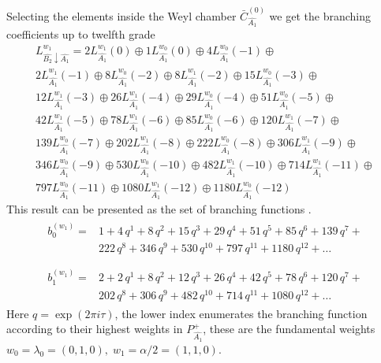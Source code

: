 \documentclass[a4paper,12pt]{article}
\theoremstyle{definition} \newtheorem{Def}{Definition}
\begin{document}
Selecting the elements inside the  Weyl chamber
$\bar{C}^{\left( 0 \right)}_{\hat{A_1}}$
we get the branching coefficients up to twelfth grade
\begin{multline}
  \label{eq:28}
  L^{w_1}_{\hat{B_2}\downarrow \hat{A_1}}=2 L_{\hat{A_1}}^{w_1}(0)\oplus 1 L_{\hat{A_1}}^{w_0}(0)\oplus 4 L_{\hat{A_1}}^{w_0}(-1)\oplus\\
    2 L_{\hat{A_1}}^{w_1}(-1)\oplus 8 L_{\hat{A_1}}^{w_0}(-2)\oplus
    8 L_{\hat{A_1}}^{w_1}(-2)\oplus 15 L_{\hat{A_1}}^{w_0}(-3)\oplus\\
    12 L_{\hat{A_1}}^{w_1}(-3)\oplus 26 L_{\hat{A_1}}^{w_1}(-4)\oplus
    29 L_{\hat{A_1}}^{w_0}(-4)\oplus 51 L_{\hat{A_1}}^{w_0}(-5)\oplus\\
    42 L_{\hat{A_1}}^{w_1}(-5)\oplus 78 L_{\hat{A_1}}^{w_1}(-6)\oplus
    85 L_{\hat{A_1}}^{w_0}(-6)\oplus 120 L_{\hat{A_1}}^{w_1}(-7)\oplus\\
    139 L_{\hat{A_1}}^{w_0}(-7)\oplus 202 L_{\hat{A_1}}^{w_1}(-8)\oplus
    222 L_{\hat{A_1}}^{w_0}(-8)\oplus 306 L_{\hat{A_1}}^{w_1}(-9)\oplus\\
    346 L_{\hat{A_1}}^{w_0}(-9)\oplus 530 L_{\hat{A_1}}^{w_0}(-10)\oplus
    482 L_{\hat{A_1}}^{w_1}(-10)\oplus 714 L_{\hat{A_1}}^{w_1}(-11)\oplus\\
    797 L_{\hat{A_1}}^{w_0}(-11)\oplus 1080 L_{\hat{A_1}}^{w_1}(-12)\oplus
    1180 L_{\hat{A_1}}^{w_0}(-12)
\end{multline}
This result can be presented as the set of branching functions \cite{kac1990idl}.
\begin{eqnarray}
  \label{eq:29}
  \begin{array}{cc}
    b^{(w_1)}_{0}= & 1 + 4\,q^{1}+ 8\,q^{2}+ 15\,q^{3}+ 29\,q^{4}+ 51\,q^{5}+ 85\,q^{6}+ 139\,q^{7}+\\
     &222\,q^{8}+ 346\,q^{9}+ 530\,q^{10}+ 797\,q^{11}+ 1180\,q^{12}+\dots\\
  \end{array}\\
  \begin{array}{cc}
    b^{(w_1)}_{1}= &2+2\,q^{1}+8\,q^{2}+12\,q^{3}+26\,q^{4}+42\,q^{5}+78\,q^{6}+120\,q^{7}+\\
    & 202\,q^{8}+306\,q^{9}+482\,q^{10}+714\,q^{11}+1080\,q^{12}+\dots
  \end{array}
\end{eqnarray}
Here $q=\exp (2\pi i \tau)$, the lower index enumerates the branching function according to their highest weights in $P^+_{\hat{A_1}}$, these are the fundamental weights $w_0=\lambda_0=(0,1,0),\; w_1=\alpha/2=(1,1,0)$.
\end{document}
